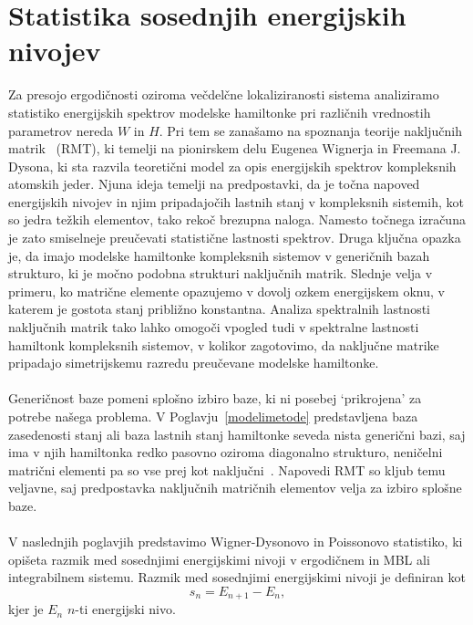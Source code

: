 \section{Statistika sosednjih energijskih nivojev}
\label{statistika_sosednjih_nivojev}
Za presojo ergodičnosti oziroma večdelčne lokaliziranosti sistema analiziramo statistiko energijskih spektrov modelske hamiltonke pri različnih vrednostih parametrov nereda $W$ in $H$. Pri tem se zanašamo na spoznanja teorije naključnih matrik~\cite{mehta2004random} (RMT), ki temelji na pionirskem delu Eugenea Wignerja in Freemana J. Dysona, ki sta razvila teoretični model za opis energijskih spektrov kompleksnih atomskih jeder. Njuna ideja temelji na predpostavki, da je točna napoved energijskih nivojev in njim pripadajočih lastnih stanj v kompleksnih sistemih, kot so jedra težkih elementov, tako rekoč brezupna naloga. Namesto točnega izračuna je zato smiselneje preučevati statistične lastnosti spektrov. Druga ključna opazka je, da imajo modelske hamiltonke kompleksnih sistemov v generičnih bazah strukturo, ki je močno podobna strukturi naključnih matrik. Slednje velja v primeru, ko matrične elemente opazujemo v dovolj ozkem energijskem oknu, v katerem je gostota stanj približno konstantna. Analiza spektralnih lastnosti naključnih matrik tako lahko omogoči vpogled tudi v spektralne lastnosti hamiltonk kompleksnih sistemov, v kolikor zagotovimo, da naključne matrike pripadajo simetrijskemu razredu preučevane modelske hamiltonke. \\\\
 Generičnost baze pomeni splošno izbiro baze, ki ni posebej `prikrojena' za potrebe našega problema. V Poglavju~\ref{modelimetode} predstavljena baza zasedenosti stanj ali baza lastnih stanj hamiltonke seveda nista generični bazi, saj ima v njih hamiltonka redko pasovno oziroma diagonalno strukturo, neničelni matrični elementi pa so vse prej kot naključni~\cite{d2016quantum}. Napovedi RMT so kljub temu veljavne, saj predpostavka naključnih matričnih elementov velja za izbiro splošne baze. \\\\
 V naslednjih poglavjih predstavimo Wigner-Dysonovo in Poissonovo statistiko, ki opišeta razmik med sosednjimi energijskimi nivoji v ergodičnem in MBL ali integrabilnem sistemu. Razmik med sosednjimi energijskimi nivoji je definiran kot 
 \begin{equation}\label{eq:razmik}
 s_n=E_{n+1}-E_n,
 \end{equation}
 kjer je $E_n$ $n$-ti energijski nivo. \\\\
